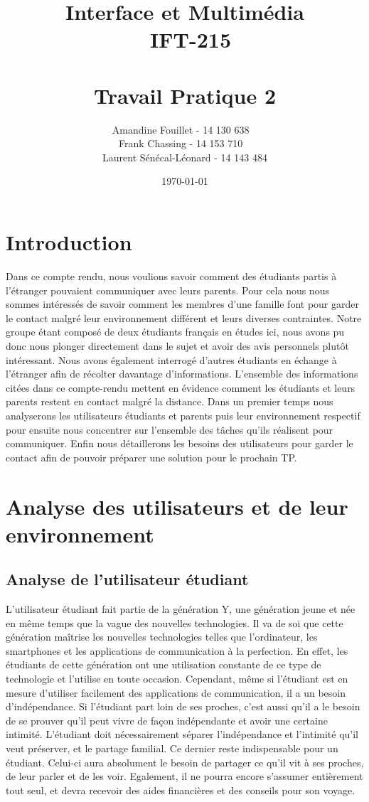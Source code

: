 \documentclass[12pt]{article}
\title{\vspace{\fill} Interface et Multimédia \\ ~\textbf{IFT-215} \\~\\ Travail Pratique 2}
\author{Amandine Fouillet - 14 130 638 ~\\ Frank Chassing - 14 153 710 ~\\ Laurent Sénécal-Léonard - 14 143 484}
\date{\today \vspace{\fill}}
\begin{document}
\maketitle
\newpage

\tableofcontents
\newpage
\section{Introduction}

Dans ce compte rendu, nous voulions savoir comment des étudiants partis à l’étranger pouvaient communiquer avec leurs parents. Pour cela nous nous sommes intéressés de savoir comment les membres d’une famille font pour garder le contact malgré leur environnement différent et leurs diverses contraintes. Notre groupe étant composé de deux étudiants français en études ici, nous avons pu donc nous plonger directement dans le sujet et avoir des avis personnels plutôt intéressant. Nous avons également interrogé d’autres étudiants en échange à l’étranger afin de récolter davantage d’informations. L’ensemble des informations citées dans ce compte-rendu mettent en évidence comment les étudiants et leurs parents restent en contact malgré la distance. Dans un premier temps nous analyserons les utilisateurs étudiants et parents puis leur environnement respectif pour ensuite nous concentrer sur l’ensemble des tâches qu’ils réalisent pour communiquer. Enfin nous détaillerons les besoins des utilisateurs pour garder le contact afin de pouvoir préparer une solution pour le prochain TP. 


\section{Analyse des utilisateurs et de leur environnement}

\subsection{Analyse de l’utilisateur étudiant}

L’utilisateur étudiant fait partie de la génération Y, une génération jeune et née en même temps que la vague des nouvelles technologies. Il va de soi que cette génération maîtrise les nouvelles technologies telles que l’ordinateur, les smartphones et les applications de communication à la perfection.  En effet, les étudiants de cette génération ont une utilisation constante de ce type de technologie et l’utilise en toute occasion. Cependant, même si l’étudiant est en mesure d’utiliser facilement des applications de communication, il a un besoin d’indépendance. Si l’étudiant part loin de ses proches, c’est aussi qu’il a le besoin de se prouver qu’il peut vivre de façon indépendante et avoir une certaine intimité. L’étudiant doit nécessairement séparer l’indépendance et l’intimité qu’il veut préserver, et  le partage familial. Ce dernier reste indispensable pour un étudiant. Celui-ci aura absolument le besoin de partager ce qu’il vit à ses proches, de leur parler et de les voir.  Egalement, il ne pourra encore s’assumer entièrement tout seul, et devra recevoir des aides financières et des conseils pour son voyage.
\end{document}

